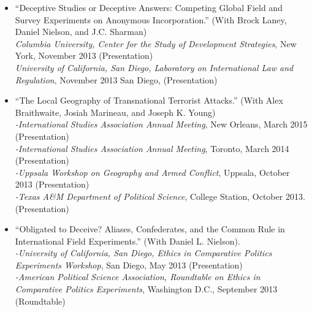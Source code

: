\documentclass[10pt]{article}
\begin{document}
\begin{itemize}

\item ``Deceptive Studies or Deceptive Answers: Competing Global Field and Survey Experiments on Anonymous Incorporation.'' (With Brock Laney, Daniel Nielson, and J.C. Sharman)
	\\ \indent \textit{Columbia University, Center for the Study of Development Strategies}, New York, November 	2013 (Presentation)
	\\ \indent \textit{University of California, San Diego, Laboratory on International Law and Regulation}, November 2013 San Diego, (Presentation)

\item ``The Local Geography of Transnational Terrorist Attacks.'' (With Alex Braithwaite, Josiah Marineau, and Joseph K. Young)
	\\ \indent \textit{-International Studies Association Annual Meeting}, New Orleans, March 2015 (Presentation)
	\\ \indent \textit{-International Studies Association Annual Meeting}, Toronto, March 2014 (Presentation)
	\\ \indent \textit{-Uppsala Workshop on Geography and Armed Conflict}, Uppsala, October 2013 (Presentation)
	\\ \indent \textit{-Texas A\&M Department of Political Science}, College Station, October 2013.	(Presentation)

\item ``Obligated to Deceive? Aliases, Confederates, and the Common Rule in International Field Experiments.'' (With Daniel L. Nielson).
	\\ \indent \textit{-University of California, San Diego, Ethics in Comparative Politics Experiments Workshop}, San Diego, May 2013 (Presentation)
	\\ \indent \textit{-American Political Science Association, Roundtable on Ethics in Comparative Politics Experiments}, Washington D.C., September 2013 (Roundtable) 



\end{itemize}
\end{document}
